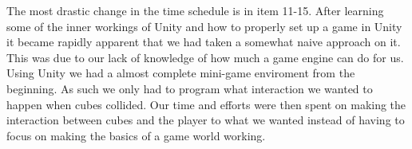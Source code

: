 The most drastic change in the time schedule is in item 11-15.
After learning some of the inner workings of Unity and how to properly set up a game in Unity it became rapidly apparent that we had taken a somewhat naive approach on it. This was due to our lack of knowledge of how much a game engine can do for us.
Using Unity we had a almost complete mini-game enviroment from the beginning. As such we only had to program what interaction we wanted to happen when cubes collided.
Our time and efforts were then spent on making the interaction between cubes and the player to what we wanted instead of having to focus on making the basics of a game world working.
